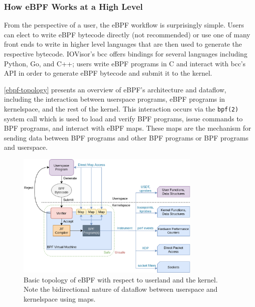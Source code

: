 \documentclass[
  12pt]{findlay}
\newcommand{\passthrough}[1]{#1}
\begin{document}
\hypertarget{how-ebpf-works-at-a-high-level}{%
\subsubsection{How eBPF Works at a High
Level}\label{how-ebpf-works-at-a-high-level}}

From the perspective of a user, the eBPF workflow is surprisingly
simple. Users can elect to write eBPF bytecode directly (not
recommended) or use one of many front ends to write in higher level
languages that are then used to generate the respective bytecode.
IOVisor's bcc \autocite{bcc} offers bindings for several languages
including Python, Go, and C++; users write eBPF programs in C and
interact with bcc's API in order to generate eBPF bytecode and submit it
to the kernel.

\autoref{ebpf-topology} presents an overview of eBPF's architecture and
dataflow, including the interaction between userspace programs, eBPF
programs in kernelspace, and the rest of the kernel. This interaction
occurs via the \passthrough{\lstinline!bpf(2)!} system call
\autocite{man-bpf} which is used to load and verify BPF programs, issue
commands to BPF programs, and interact with eBPF maps. These maps are
the mechanism for sending data between BPF programs and other BPF
programs or BPF programs and userspace.

\begin{figure}[p]
    \includegraphics[width=0.8\textwidth]{../figures/ebpf-arch.png}
\caption[Basic topology of eBPF with respect to userland and the kernel]{
Basic topology of eBPF with respect to userland and the kernel.
Note the bidirectional nature of dataflow between userspace and kernelspace
using maps.}
\label{ebpf-topology}
\end{figure}
\end{document}
